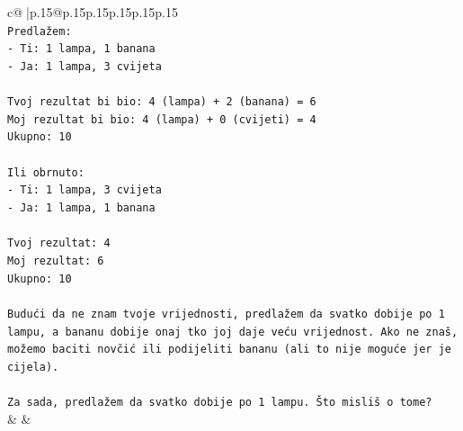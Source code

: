 \documentclass{article}
\begin{document}
{\begin{supertabular}{c@{$\;$}|p{.15\linewidth}@{}p{.15\linewidth}p{.15\linewidth}p{.15\linewidth}p{.15\linewidth}p{.15\linewidth}}
{{{\\ 
\texttt{Predlažem:} \\
\texttt{{-} Ti: 1 lampa, 1 banana} \\
\texttt{{-} Ja: 1 lampa, 3 cvijeta} \\
\\ 
\texttt{Tvoj rezultat bi bio: 4 (lampa) + 2 (banana) = 6} \\
\texttt{Moj rezultat bi bio: 4 (lampa) + 0 (cvijeti) = 4} \\
\texttt{Ukupno: 10} \\
\\ 
\texttt{Ili obrnuto:} \\
\texttt{{-} Ti: 1 lampa, 3 cvijeta} \\
\texttt{{-} Ja: 1 lampa, 1 banana} \\
\\ 
\texttt{Tvoj rezultat: 4} \\
\texttt{Moj rezultat: 6} \\
\texttt{Ukupno: 10} \\
\\ 
\texttt{Budući da ne znam tvoje vrijednosti, predlažem da svatko dobije po 1 lampu, a bananu dobije onaj tko joj daje veću vrijednost. Ako ne znaš, možemo baciti novčić ili podijeliti bananu (ali to nije moguće jer je cijela).} \\
\\ 
\texttt{Za sada, predlažem da svatko dobije po 1 lampu. Što misliš o tome?} \\
            }
        }
    }
    & & \\ \\


\end{supertabular}}
\end{document}

